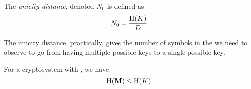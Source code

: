 \begin{definition}\label{def:Unicity_Distance}
  The \emph{unicity distance}, denoted $N_{0}$ is defined as
  \begin{equation}\label{eq:Unicity_Distance}
    N_{0} = \frac{\operatorname{\operatorname{H}}(K)}{D}
  \end{equation}

  The unicity distance, practically, gives the number of symbols in the  we need to observe to go from having multiple possible keys to a single possible key.
\end{definition}

\begin{theorem}\label{thm:Perfect_Secrecy_Drawback}
  For a cryptosystem with , we have
  \begin{equation*}
    \operatorname{\operatorname{H}}(\mathbf{M}) \leq \operatorname{\operatorname{H}}(K)
  \end{equation*}
\end{theorem}

